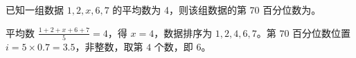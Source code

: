 \begin{question}
已知一组数据 $1, 2, x, 6, 7$ 的平均数为 4，则该组数据的第 70 百分位数为\fillin[$6$]。
\begin{solution}
平均数 $\frac{1+2+x+6+7}{5}=4$，得 $x=4$，数据排序为 $1,2,4,6,7$。第 $70$ 百分位数位置 $i=5\times0.7=3.5$，非整数，取第 $4$ 个数，即 $6$。
\end{solution}
\end{question}

